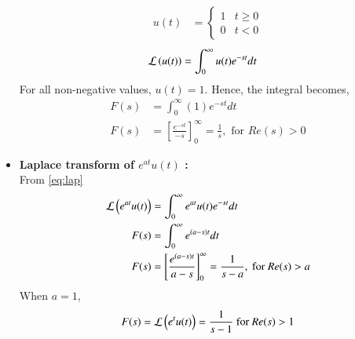 \documentclass[journal]{IEEEtran}
\begin{document}
\begin{itemize}
		\begin{align}
			u(t) &= 
			\begin{cases} 
			1 & t \geq 0 \\
			0 & t < 0
			\end{cases} \label{eq:ut}
		\end{align}
		\begin{align}
			\mathcal{L} \left(u(t)\right) &= \int_{0}^{\infty} u(t) e^{-st} dt 
		\end{align}
		For all non-negative values, $u(t) = 1$. Hence, the integral becomes,
		\begin{align}
			F(s) &= \int_{0}^{\infty} (1)e^{-st} dt \\
			F(s) &= \left[ \frac{e^{-st}}{-s} \right]_{0}^{\infty} = \frac{1}{s} ,  \text{ for } Re(s) > 0 \label{eq:first}
		\end{align}
	\item \textbf{Laplace transform of $e^{at} u(t)$ :} \\
		From \eqref{eq:lap}
		\begin{align}
			\mathcal{L} \left(e^{at} u(t)\right) &= \int_{0}^{\infty} e^{at} u(t) e^{-st} dt \\
			F(s) &= \int_{0}^{\infty} e^{(a-s)t} dt \\
			F(s) &= \left[\frac{e^{(a-s)t}}{a-s} \right]_{0}^{\infty} = \frac{1}{s-a} , \text{ for } Re(s) > a
		\end{align}
		When $a=1$, 
		\begin{align}
			F(s) = \mathcal{L} \left(e^t u(t)\right) = \frac{1}{s-1} \label{eq:second} \text{ for } Re(s) > 1  
		\end{align}
\end{itemize}
\end{document}
